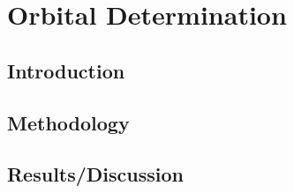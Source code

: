 \documentclass[Space3_Assign1.tex]{subfiles}
\begin{document}
\section{Orbital Determination}

\subsection{Introduction}

\subsection{Methodology}

\subsection{Results/Discussion}
\end{document}
